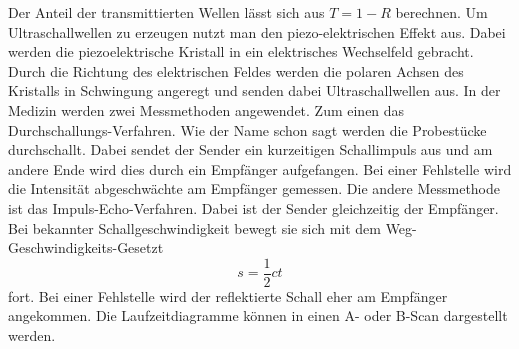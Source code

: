 Der Anteil der transmittierten Wellen lässt sich aus $T=1-R$ berechnen.
Um Ultraschallwellen zu erzeugen nutzt man den piezo-elektrischen Effekt aus.
Dabei werden die piezoelektrische Kristall in ein elektrisches Wechselfeld gebracht.
Durch die Richtung des elektrischen Feldes werden die polaren Achsen des Kristalls in Schwingung angeregt und
senden dabei Ultraschallwellen aus.
In der Medizin werden zwei Messmethoden angewendet.
Zum einen das Durchschallungs-Verfahren. Wie der Name schon sagt werden die Probestücke durchschallt. Dabei sendet
der Sender ein kurzeitigen Schallimpuls aus und am andere Ende wird dies durch ein Empfänger aufgefangen.
Bei einer Fehlstelle wird die Intensität abgeschwächte am Empfänger gemessen.
Die andere Messmethode ist das Impuls-Echo-Verfahren. Dabei ist der Sender gleichzeitig der Empfänger. Bei bekannter Schallgeschwindigkeit
bewegt sie sich mit dem Weg-Geschwindigkeits-Gesetzt
\begin{equation}
  s=\frac{1}{2} c t
  \label{eq:6}
\end{equation}
fort. Bei einer Fehlstelle wird der reflektierte Schall eher am Empfänger angekommen.
Die Laufzeitdiagramme können in einen A- oder B-Scan dargestellt werden.
